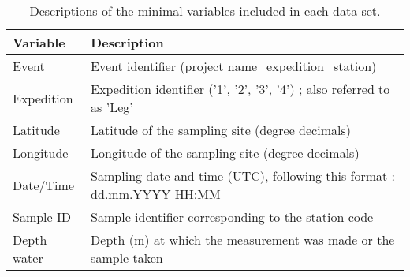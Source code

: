 \begin{table}

\caption{Descriptions of the minimal variables included in each data set.}
\centering
\begin{tabular}[t]{ll}
\toprule
Variable & Description\\
\midrule
Event & Event identifier (project name\_expedition\_station)\\
Expedition & Expedition identifier ('1', '2', '3', '4') ; also referred to as 'Leg'\\
Latitude & Latitude of the sampling site (degree decimals)\\
Longitude & Longitude of the sampling site (degree decimals)\\
Date/Time & Sampling date and time (UTC), following this format : dd.mm.YYYY HH:MM\\
\addlinespace
Sample ID & Sample identifier corresponding to the station code\\
Depth water & Depth (m) at which the measurement was made or the sample taken\\
\bottomrule
\end{tabular}
\end{table}
